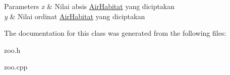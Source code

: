 \begin{DoxyParams}{Parameters}
{\em x} & Nilai absis \hyperlink{classAirHabitat}{Air\+Habitat} yang diciptakan \\
\hline
{\em y} & Nilai ordinat \hyperlink{classAirHabitat}{Air\+Habitat} yang diciptakan \\
\hline
\end{DoxyParams}


The documentation for this class was generated from the following files\+:\begin{DoxyCompactItemize}
\item 
zoo.\+h\item 
zoo.\+cpp\end{DoxyCompactItemize}
